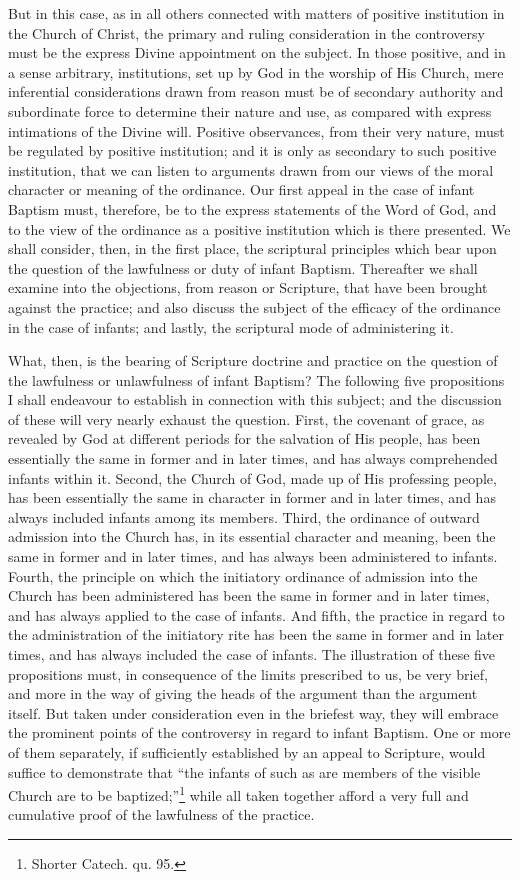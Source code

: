 \documentclass[]{book}
\begin{document}
But in this case, as in all others connected with matters of positive institution in the Church of Christ, the primary and ruling consideration in the controversy must be the express Divine appointment on the subject. In those positive, and in a sense arbitrary, institutions, set up by God in the worship of His Church, mere inferential considerations drawn from reason must be of secondary authority and subordinate force to determine their nature and use, as compared with express intimations of the Divine will. Positive observances, from their very nature, must be regulated by positive institution; and it is only as secondary to such positive institution, that we can listen to arguments drawn from our views of the moral character or meaning of the ordinance. Our first appeal in the case of infant Baptism must, therefore, be to the express statements of the Word of God, and to the view of the ordinance as a positive institution which is there presented. We shall consider, then, in the first place, the scriptural principles which bear upon the question of the lawfulness or duty of infant Baptism. Thereafter we shall examine into the objections, from reason or Scripture, that have been brought against the practice; and also discuss the subject of the efficacy of the ordinance in the case of infants; and lastly, the scriptural mode of administering it.

What, then, is the bearing of Scripture doctrine and practice on the question of the lawfulness or unlawfulness of infant Baptism? The following five propositions I shall endeavour to establish in connection with this subject; and the discussion of these will very nearly exhaust the question. First, the covenant of grace, as revealed by God at different periods for the salvation of His people, has been essentially the same in former and in later times, and has always comprehended infants within it. Second, the Church of God, made up of His professing people, has been essentially the same in character in former and in later times, and has always included infants among its members. Third, the ordinance of outward admission into the Church has, in its essential character and meaning, been the same in former and in later times, and has always been administered to infants. Fourth, the principle on which the initiatory ordinance of admission into the Church has been administered has been the same in former and in later times, and has always applied to the case of infants. And fifth, the practice in regard to the administration of the initiatory rite has been the same in former and in later times, and has always included the case of infants. The illustration of these five propositions must, in consequence of the limits prescribed to us, be very brief, and more in the way of giving the heads of the argument than the argument itself. But taken under consideration even in the briefest way, they will embrace the prominent points of the controversy in regard to infant Baptism. One or more of them separately, if sufficiently established by an appeal to Scripture, would suffice to demonstrate that ``the infants of such as are members of the visible Church are to be baptized;''\footnote{Shorter Catech. qu. 95.} while all taken together afford a very full and cumulative proof of the lawfulness of the practice.
\end{document}
